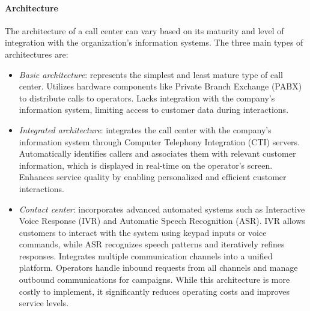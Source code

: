 \paragraph*{Architecture}
The architecture of a call center can vary based on its maturity and level of integration with the organization's information systems. 
The three main types of architectures are:
\begin{itemize}
    \item \textit{Basic architecture}: represents the simplest and least mature type of call center.
        Utilizes hardware components like Private Branch Exchange (PABX) to distribute calls to operators.
        Lacks integration with the company's information system, limiting access to customer data during interactions.
    \item \textit{Integrated architecture}: integrates the call center with the company's information system through Computer Telephony Integration (CTI) servers.
        Automatically identifies callers and associates them with relevant customer information, which is displayed in real-time on the operator's screen.
        Enhances service quality by enabling personalized and efficient customer interactions.
    \item \textit{Contact center}: incorporates advanced automated systems such as Interactive Voice Response (IVR) and Automatic Speech Recognition (ASR).
        IVR allows customers to interact with the system using keypad inputs or voice commands, while ASR recognizes speech patterns and iteratively refines responses.
        Integrates multiple communication channels into a unified platform.
        Operators handle inbound requests from all channels and manage outbound communications for campaigns.
        While this architecture is more costly to implement, it significantly reduces operating costs and improves service levels.
\end{itemize}

